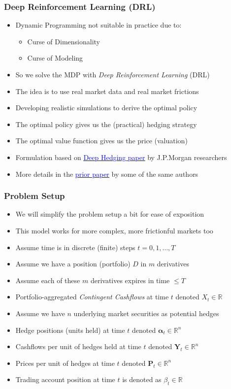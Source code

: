 \documentclass[handout]{beamer}
\begin{document}
\begin{frame}
\frametitle{Deep Reinforcement Learning (DRL)}
\pause
\begin{itemize}[<+->]
\item Dynamic Programming not suitable in practice due to:
\begin{itemize}
\item Curse of Dimensionality
\item Curse of Modeling
\end{itemize}
\item So we solve the MDP with {\em Deep Reinforcement Learning} (DRL)
\item The idea is to use real market data and real market frictions
\item Developing realistic simulations to derive the optimal policy
\item The optimal policy gives us the (practical) hedging strategy
\item The optimal value function gives us the price (valuation)
\item Formulation based on \href{https://papers.ssrn.com/sol3/papers.cfm?abstract_id=3355706}{\underline{\textcolor{blue}{Deep Hedging paper}}} by J.P.Morgan researchers
\item More details in the \href{https://papers.ssrn.com/sol3/papers.cfm?abstract_id=3355706}{\underline{\textcolor{blue}{prior paper}}} by some of the same authors
\end{itemize}
\end{frame}

\begin{frame}
\frametitle{Problem Setup}
\pause
\begin{itemize}[<+->]
\item We will simplify the problem setup a bit for ease of exposition
\item This model works for more complex, more frictionful markets too
\item Assume time is in discrete (finite) steps $t = 0, 1, \ldots, T$
\item Assume we have a position (portfolio) $D$ in $m$ derivatives
\item Assume each of these $m$ derivatives expires in time $ \leq T$
\item Portfolio-aggregated {\em Contingent Cashflows} at time $t$ denoted $X_t \in \mathbb{R}$
\item Assume we have $n$ underlying market securities as potential hedges
\item Hedge positions (units held) at time $t$ denoted $\bm{\alpha}_t \in \mathbb{R}^n$
\item Cashflows per unit of hedges held at time $t$ denoted $\bm{Y}_t \in \mathbb{R}^n$
\item Prices per unit of hedges at time $t$ denoted $\bm{P}_t \in \mathbb{R}^n$
\item Trading account position at time $t$ is denoted as $\beta_t \in \mathbb{R}$
\end{itemize}
\end{frame}
\end{document}
